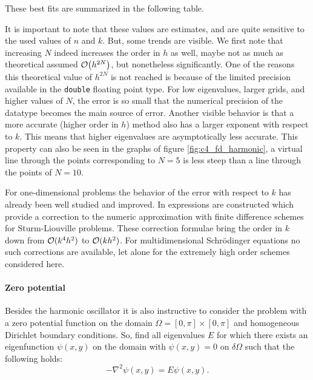 These best fits are summarized in the following table.
\begin{center}
    
\end{center}

It is important to note that these values are estimates, and are quite sensitive to the used values of $n$ and $k$. But, some trends are visible. We first note that increasing $N$ indeed increases the order in $h$ as well, maybe not as much as theoretical assumed $\OO\mleft(h^{2N}\mright)$, but nonetheless significantly. One of the reasons this theoretical value of $h^{2N}$ is not reached is because of the limited precision available in the \texttt{double} floating point type. For low eigenvalues, larger grids, and higher values of $N$, the error is so small that the numerical precision of the datatype becomes the main source of error. Another visible behavior is that a more accurate (higher order in $h$) method also has a larger exponent with respect to $k$. This means that higher eigenvalues are asymptotically less accurate. This property can also be seen in the graphs of figure \ref{fig:c4_fd_harmonic}, a virtual line through the points corresponding to $N = 5$ is less steep than a line through the points of $N = 10$.

For one-dimensional problems the behavior of the error with respect to $k$ has already been well studied and improved. In \cite{paine_correction_1981} expressions are constructed which provide a correction to the numeric approximation with finite difference schemes for Sturm-Liouville problems. These correction formulae bring the order in $k$ down from $\operatorname{\mathcal{O}}(k^4h^2)$ to $\operatorname{\mathcal{O}}(k h^2)$. For multidimensional Schrödinger equations no such corrections are available, let alone for the extremely high order schemes considered here.

\paragraph{Zero potential} Besides the harmonic oscillator it is also instructive to consider the problem with a zero potential function on the domain $\Omega = [0, \pi] \times [0, \pi]$ and homogeneous Dirichlet boundary conditions. So, find all eigenvalues $E$ for which there exists an eigenfunction $\psi(x, y)$ on the domain with $\psi(x, y) = 0$ on $\delta\Omega$ such that the following holds:
\begin{equation}\label{equ:c4_fd_zero}
    -\nabla^2 \psi(x, y) = E \psi(x, y) \text{.}
\end{equation}

